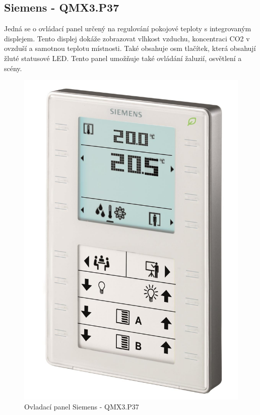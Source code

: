 \subsection{Siemens - QMX3.P37}
Jedná se o ovládací panel určený na regulování pokojové teploty s integrovaným displejem. Tento displej dokáže zobrazovat vlhkost vzduchu, koncentraci CO2 v ovzduší a samotnou teplotu místnosti. Také obsahuje osm tlačítek, která obsahují žluté statusové LED. Tento panel umožňuje také ovládání žaluzií, osvětlení a scény. \cite{Siemens}

\begin{figure}[!ht]
  \begin{center}
    \includegraphics[scale=0.125]{obrazky/Siemens.jpg}
  \end{center}
  \caption[Ovladací panel Siemens - QMX3.P37 \cite{Siemens}]{Ovladací panel Siemens - QMX3.P37 \cite{Siemens}}
  \label{fig:Ovladací panel Siemens - QMX3.P37}
\end{figure}

